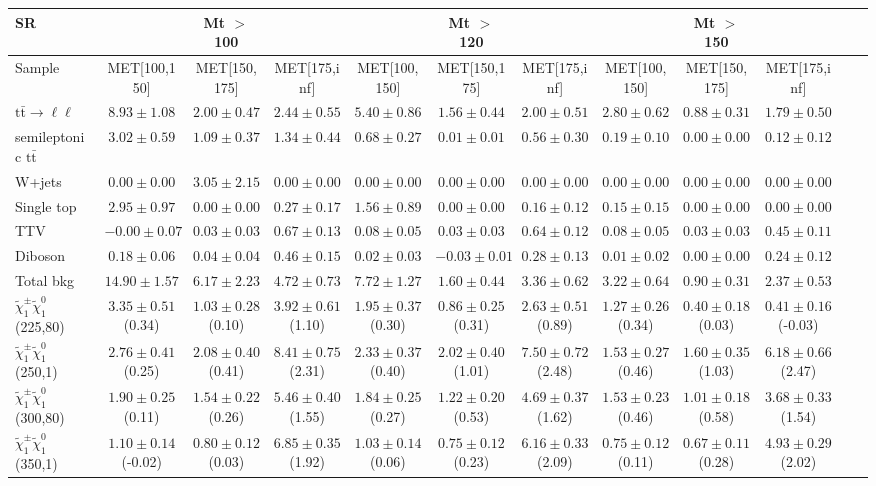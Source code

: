 \begin{table}
\begin{center}
\small
\begin{tabular}{lccccccccccc}
\hline
SR & & Mt $>$ 100 & & & Mt $>$ 120 & & &Mt $>$ 150 & & &\\
\hline
Sample&MET[100,150]&MET[150,175]&MET[175,inf]&MET[100,150]&MET[150,175]&MET[175,inf]&MET[100,150]&MET[150,175]&MET[175,inf]&\\
\hline
$\mathrm{t}\bar{\mathrm{t}}\rightarrow \ell\ell$&$8.93\pm1.08$&$2.00\pm0.47$&$2.44\pm0.55$&$5.40\pm0.86$&$1.56\pm0.44$&$2.00\pm0.51$&$2.80\pm0.62$&$0.88\pm0.31$&$1.79\pm0.50$\\
semileptonic $\mathrm{t}\bar{\mathrm{t}}$&$3.02\pm0.59$&$1.09\pm0.37$&$1.34\pm0.44$&$0.68\pm0.27$&$0.01\pm0.01$&$0.56\pm0.30$&$0.19\pm0.10$&$0.00\pm0.00$&$0.12\pm0.12$\\
W+jets&$0.00\pm0.00$&$3.05\pm2.15$&$0.00\pm0.00$&$0.00\pm0.00$&$0.00\pm0.00$&$0.00\pm0.00$&$0.00\pm0.00$&$0.00\pm0.00$&$0.00\pm0.00$\\
Single top&$2.95\pm0.97$&$0.00\pm0.00$&$0.27\pm0.17$&$1.56\pm0.89$&$0.00\pm0.00$&$0.16\pm0.12$&$0.15\pm0.15$&$0.00\pm0.00$&$0.00\pm0.00$\\
TTV&$-0.00\pm0.07$&$0.03\pm0.03$&$0.67\pm0.13$&$0.08\pm0.05$&$0.03\pm0.03$&$0.64\pm0.12$&$0.08\pm0.05$&$0.03\pm0.03$&$0.45\pm0.11$\\
Diboson&$0.18\pm0.06$&$0.04\pm0.04$&$0.46\pm0.15$&$0.02\pm0.03$&$-0.03\pm0.01$&$0.28\pm0.13$&$0.01\pm0.02$&$0.00\pm0.00$&$0.24\pm0.12$\\
\hline
Total bkg&$14.90\pm1.57$&$6.17\pm2.23$&$4.72\pm0.73$&$7.72\pm1.27$&$1.60\pm0.44$&$3.36\pm0.62$&$3.22\pm0.64$&$0.90\pm0.31$&$2.37\pm0.53$\\
$\tilde{\chi}_{1}^{\pm}\tilde{\chi}_{1}^{0}$ (225,80)&$3.35\pm0.51$(0.34)&$1.03\pm0.28$(0.10)&$3.92\pm0.61$(1.10)&$1.95\pm0.37$(0.30)&$0.86\pm0.25$(0.31)&$2.63\pm0.51$(0.89)&$1.27\pm0.26$(0.34)&$0.40\pm0.18$(0.03)&$0.41\pm0.16$(-0.03)\\
$\tilde{\chi}_{1}^{\pm}\tilde{\chi}_{1}^{0}$ (250,1)&$2.76\pm0.41$(0.25)&$2.08\pm0.40$(0.41)&$8.41\pm0.75$(2.31)&$2.33\pm0.37$(0.40)&$2.02\pm0.40$(1.01)&$7.50\pm0.72$(2.48)&$1.53\pm0.27$(0.46)&$1.60\pm0.35$(1.03)&$6.18\pm0.66$(2.47)\\
$\tilde{\chi}_{1}^{\pm}\tilde{\chi}_{1}^{0}$ (300,80)&$1.90\pm0.25$(0.11)&$1.54\pm0.22$(0.26)&$5.46\pm0.40$(1.55)&$1.84\pm0.25$(0.27)&$1.22\pm0.20$(0.53)&$4.69\pm0.37$(1.62)&$1.53\pm0.23$(0.46)&$1.01\pm0.18$(0.58)&$3.68\pm0.33$(1.54)\\
$\tilde{\chi}_{1}^{\pm}\tilde{\chi}_{1}^{0}$ (350,1)&$1.10\pm0.14$(-0.02)&$0.80\pm0.12$(0.03)&$6.85\pm0.35$(1.92)&$1.03\pm0.14$(0.06)&$0.75\pm0.12$(0.23)&$6.16\pm0.33$(2.09)&$0.75\pm0.12$(0.11)&$0.67\pm0.11$(0.28)&$4.93\pm0.29$(2.02)\\
\hline
\hline\hline
\end{tabular}
\end{center}
\end{table}
